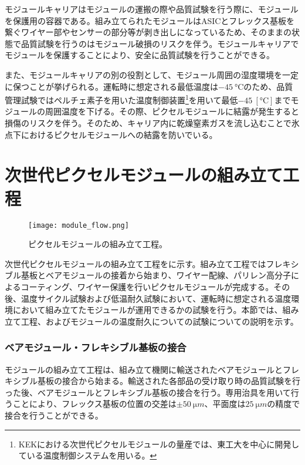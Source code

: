 モジュールキャリアはモジュールの運搬の際や品質試験を行う際に、モジュールを保護用の容器である。組み立てられたモジュールはASICとフレックス基板を繋ぐワイヤー部やセンサーの部分等が剥き出しになっているため、そのままの状態で品質試験を行うのはモジュール破損のリスクを伴う。モジュールキャリアでモジュールを保護することにより、安全に品質試験を行うことができる。

また、モジュールキャリアの別の役割として、モジュール周囲の湿度環境を一定に保つことが挙げられる。運転時に想定される最低温度は$-45\ \si{\degreeCelsius}$のため、品質管理試験ではペルチェ素子を用いた温度制御装置\footnote{KEKにおける次世代ピクセルモジュールの量産では、東工大を中心に開発している温度制御システムを用いる。}を用いて最低$-45\ [\si{\degreeCelsius}]$までモジュールの周囲温度を下げる。その際、ピクセルモジュールに結露が発生すると損傷のリスクを伴う。そのため、キャリア内に乾燥窒素ガスを流し込むことで氷点下におけるピクセルモジュールへの結露を防いでいる。

\section{次世代ピクセルモジュールの組み立て工程}
\label{sec:assemble}
\begin{figure}[tbp]
  \centering
  \texttt{[image: module\_flow.png]}
  \caption[ピクセルモジュールの組み立て工程]{ピクセルモジュールの組み立て工程。 }
  \label{fig:assemble}
\end{figure}


次世代ピクセルモジュールの組み立て工程をに示す。組み立て工程ではフレキシブル基板とベアモジュールの接着から始まり、ワイヤー配線、パリレン高分子によるコーティング、ワイヤー保護を行いピクセルモジュールが完成する。その後、温度サイクル試験および低温耐久試験において、運転時に想定される温度環境において組み立てたモジュールが運用できるかの試験を行う。本節では、組み立て工程、およびモジュールの温度耐久についての試験についての説明を示す。

\subsubsection*{ベアモジュール・フレキシブル基板の接合}

モジュールの組み立て工程は、組み立て機関に輸送されたベアモジュールとフレキシブル基板の接合から始まる。輸送された各部品の受け取り時の品質試験を行った後、ベアモジュールとフレキシブル基板の接合を行う。専用治具を用いて行うことにより、フレックス基板の位置の交差は$\pm 50\ \si{\micro m}$、平面度は$25\ \si{\micro m}$の精度で接合を行うことができる。

